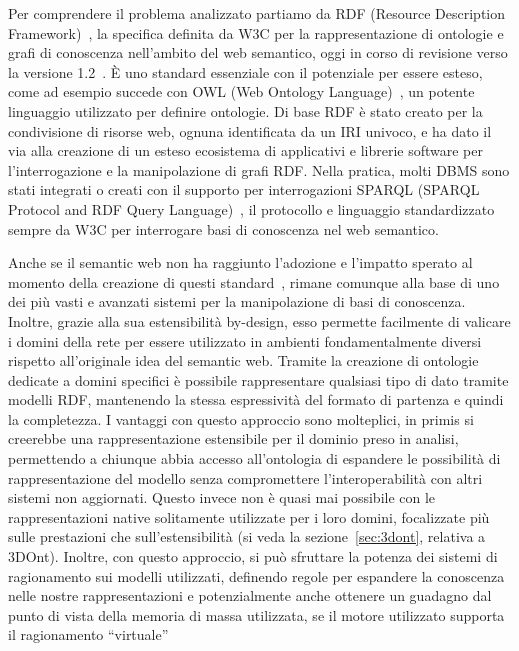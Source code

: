 \par Per comprendere il problema analizzato partiamo da RDF (Resource Description Framework)~\cite{w3c-rdf11},
la specifica definita da W3C per la rappresentazione di ontologie e grafi
di conoscenza nell'ambito del web semantico, oggi in corso di revisione verso la versione 1.2~\cite{w3c-rdf12}. 
È uno standard essenziale con il potenziale per essere esteso, come ad esempio succede con OWL (Web Ontology Language)~\cite{w3c-owl2}, 
un potente linguaggio utilizzato per definire ontologie. Di base RDF è stato creato per la condivisione di risorse web, 
ognuna identificata da un IRI univoco, e ha dato il via alla creazione di un esteso ecosistema di applicativi e librerie
software per l'interrogazione e la manipolazione di grafi RDF. Nella pratica, molti DBMS sono stati integrati o creati con
il supporto per interrogazioni SPARQL (SPARQL Protocol and RDF Query Language)~\cite{w3c-sparql11}, il protocollo e linguaggio standardizzato
sempre da W3C per interrogare basi di conoscenza nel web semantico.
\par
Anche se il semantic web non ha raggiunto l'adozione e l'impatto sperato al momento della creazione di questi
standard~\cite{bernerslee2001semantic},
rimane comunque alla base di uno dei più vasti e avanzati sistemi per la manipolazione di basi di conoscenza. Inoltre,
grazie alla sua estensibilità by-design, esso permette facilmente di valicare i domini della rete per essere utilizzato
in ambienti fondamentalmente diversi rispetto all'originale idea del semantic web.
Tramite la creazione di ontologie dedicate a domini specifici è possibile rappresentare qualsiasi tipo di dato
tramite modelli RDF, mantenendo la stessa espressività del formato di partenza e quindi la completezza.
I vantaggi con questo approccio sono molteplici, in primis si creerebbe una rappresentazione estensibile per il
dominio preso in analisi, permettendo a chiunque abbia accesso all'ontologia di espandere le possibilità di rappresentazione
del modello senza compromettere l'interoperabilità con altri sistemi non aggiornati. Questo invece non è quasi mai possibile
con le rappresentazioni native solitamente utilizzate per i loro domini, focalizzate più sulle prestazioni che sull'estensibilità
(si veda la sezione~\ref{sec:3dont}, relativa a 3DOnt).
Inoltre, con questo approccio, si può sfruttare la potenza dei sistemi di ragionamento sui modelli utilizzati,
definendo regole per espandere la conoscenza nelle nostre rappresentazioni e potenzialmente anche ottenere un guadagno
dal punto di vista della memoria di massa utilizzata, se il motore utilizzato supporta il ragionamento ``virtuale''
